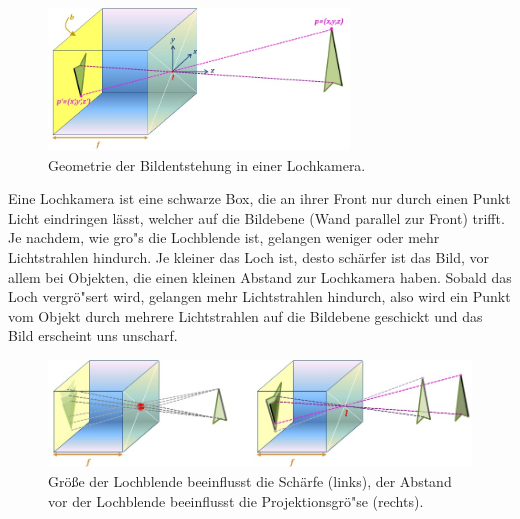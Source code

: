 \begin{figure}[h]
\centering
\includegraphics[width=8cm]{chapters/computervision/Grafik_1_Lochkamera.JPG}
\caption{Geometrie der Bildentstehung in einer Lochkamera.}
\label{fig:1}
\end{figure}
Eine Lochkamera ist eine schwarze Box, die an ihrer Front nur durch einen Punkt Licht eindringen lässt, welcher auf die Bildebene (Wand parallel zur Front) trifft. Je nachdem, wie gro"s die Lochblende ist, gelangen weniger oder mehr Lichtstrahlen hindurch. Je kleiner das Loch ist, desto schärfer ist das Bild, vor allem bei Objekten, die einen kleinen Abstand zur Lochkamera haben. Sobald das Loch vergrö"sert wird, gelangen mehr Lichtstrahlen hindurch, also wird ein Punkt vom Objekt durch mehrere Lichtstrahlen auf die Bildebene geschickt und das Bild erscheint uns unscharf.
\begin{figure} [h]
\centering
\includegraphics[width=12cm]{chapters/computervision/Grafik_3_Lochkamera.JPG}
\caption{Größe der Lochblende beeinflusst die Schärfe (links), der Abstand vor der Lochblende beeinflusst die Projektionsgrö"se (rechts).}
\label{fig:3}
\end{figure}

